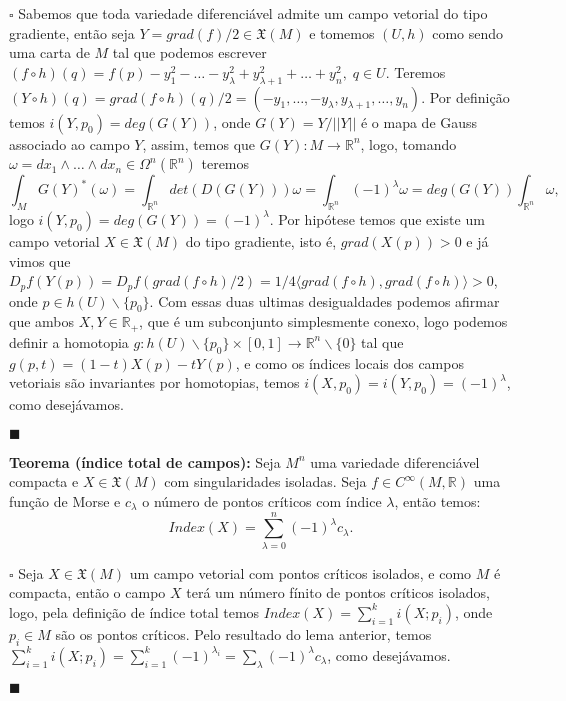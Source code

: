 \documentclass{article}
\begin{document}
	$\square$ Sabemos que toda variedade diferenciável admite um campo vetorial do tipo gradiente, então seja $Y =  grad(f)/2 \in \mathfrak{X}(M)$ e tomemos $(U, h)$ como sendo uma carta de $M$ tal que podemos escrever $(f \circ h) (q) = f(p) - y_{1}^{2} - \dots - y_{\lambda}^{2} + y_{\lambda+1}^{2} + \dots + y_{n}^{2}, \; q \in U$. Teremos $(Y \circ h)(q) = grad(f\circ h)(q)/2 = (-y_{1}, \dots, -y_{\lambda}, y_{\lambda+1}, \dots, y_{n})$. Por definição temos $i(Y, p_{0}) = deg(G(Y))$, onde $G(Y) = Y/||Y||$ é o mapa de Gauss associado ao campo $Y$, assim, temos que $G(Y):M \to \mathbb{R}^n$, logo, tomando $\omega  = dx_{1} \wedge \dots \wedge dx_{n} \in \Omega^{n}(\mathbb{R}^{n})$ teremos 
	$$
	\int_{M} G(Y)^{*}(\omega) = \int_{\mathbb{R}^{n}} det(D(G(Y))) \omega = \int_{\mathbb{R}^{n}} (-1)^{\lambda} \omega =    deg(G(Y))\int_{\mathbb{R}^{n}} \omega, 
	$$
	logo $i(Y, p_{0}) = deg(G(Y)) = (-1)^{\lambda}$. Por hipótese temos que existe um campo vetorial $X \in \mathfrak{X}(M)$ do tipo gradiente, isto é, $grad(X(p)) > 0$ e já vimos que $D_{p}f(Y(p)) = D_{p}f(grad(f \circ h)/2) = 1/4\langle grad(f\circ h), grad(f\circ h) \rangle>0$, onde $p \in h(U)\backslash\{p_{0}\}$. Com essas duas ultimas desigualdades podemos afirmar que ambos $X, Y \in \mathbb{R}_{+}$, que é um subconjunto simplesmente conexo, logo podemos definir a homotopia $g: h(U)\backslash\{p_{0}\} \times [0,1] \to \mathbb{R}^{n}\backslash \{0\}$ tal que $g(p, t) = (1-t)X(p) - tY(p)$, e como os índices locais dos campos vetoriais são invariantes por homotopias, temos $i(X, p_{0}) = i(Y, p_{0}) = (-1)^{\lambda}$, como desejávamos.
	
	$\blacksquare$
	
	\vspace{2mm}
	\textbf{Teorema (índice total de campos):} Seja $M^{n}$ uma variedade diferenciável compacta e $X \in \mathfrak{X}(M)$ com singularidades isoladas. Seja $f \in C^{\infty}(M, \mathbb{R})$ uma função de Morse e $c_{\lambda}$ o número de pontos críticos com índice $\lambda$, então temos:
	$$
	Index(X) = \sum_{\lambda = 0}^{n}(-1)^{\lambda}c_{\lambda}.
	$$
	
	$\square$ Seja $X \in \mathfrak{X}(M)$ um campo vetorial com pontos críticos isolados, e como $M$ é compacta, então o campo $X$ terá um número fínito de pontos críticos isolados, logo, pela definição de índice total temos $Index(X) = \sum_{i=1}^{k} i(X;p_{i})$, onde $p_{i} \in M$ são os pontos críticos. Pelo resultado do lema anterior, temos $\sum_{i=1}^{k} i(X;p_{i}) = \sum_{i=1}^{k} (-1)^{\lambda_{i}} = \sum_{\lambda}(-1)^{\lambda}c_{\lambda}$, como desejávamos.
	
	$\blacksquare$
\end{document}
